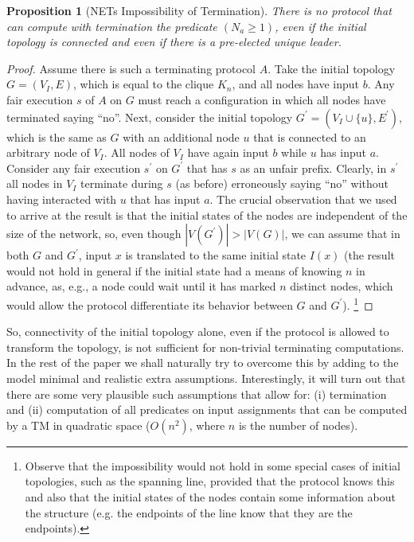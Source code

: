 \documentclass[preprint]{elsarticle}
\newtheorem{proposition}{Proposition}
\begin{document}
\begin{proposition} [NETs Impossibility of Termination] \label{pro:termination-impossibility}
There is no protocol that can compute with termination the predicate $(N_a\geq 1)$, even if the initial topology is connected and even if there is a pre-elected unique leader.
\end{proposition}
\begin{proof} 
Assume there is such a terminating protocol $A$. Take the initial topology $G=(V_I,E)$, which is equal to the clique $K_n$, and all nodes have input $b$. Any fair execution $s$ of $A$ on $G$ must reach a configuration in which all nodes have terminated saying ``no''. Next, consider the initial topology $G^\prime=(V_I\cup \{u\},E^\prime)$, which is the same as $G$ with an additional node $u$ that is connected to an arbitrary node of $V_I$. All nodes of $V_I$ have again input $b$ while $u$ has input $a$. Consider any fair execution $s^\prime$ on $G^\prime$ that has $s$ as an unfair prefix. Clearly, in $s^\prime$ all nodes in $V_I$ terminate during $s$ (as before) erroneously saying ``no'' without having interacted with $u$ that has input $a$. The crucial observation that we used to arrive at the result is that the initial states of the nodes are independent of the size of the network, so, even though $|V(G^\prime)|>|V(G)|$, we can assume that in both $G$ and $G^\prime$, input $x$ is translated to the same initial state $I(x)$ (the result would not hold in general if the initial state had a means of knowing $n$ in advance, as, e.g., a node could wait until it has marked $n$ distinct nodes, which would allow the protocol differentiate its behavior between $G$ and $G^\prime$). \footnote{Observe that the impossibility would not hold in some special cases of initial topologies, such as the spanning line, provided that the protocol knows this and also that the initial states of the nodes contain some information about the structure (e.g. the endpoints of the line know that they are the endpoints).} 
\end{proof} 

So, connectivity of the initial topology alone, even if the protocol is allowed to transform the topology, is not sufficient for non-trivial terminating computations. In the rest of the paper we shall naturally try to overcome this by adding to the model minimal and realistic extra assumptions. Interestingly, it will turn out that there are some very plausible such assumptions that allow for: (i) termination and (ii) computation of all predicates on input assignments that can be computed by a TM in quadratic space ($O(n^2)$, where $n$ is the number of nodes). 
\end{document}
